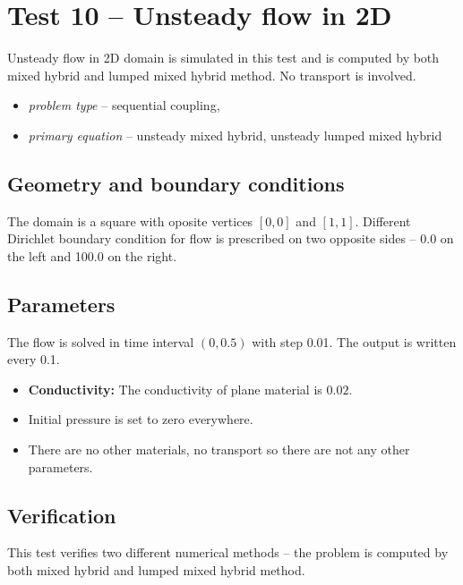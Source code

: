 
\section{Test 10 -- Unsteady flow in 2D}
\label{sec:test10}
Unsteady flow in 2D domain is simulated in this test and is computed by both mixed hybrid and lumped mixed hybrid method. No transport is involved. 

\begin{itemize} 
    \item \emph{problem type} -- sequential coupling, 
    \item \emph{primary equation} -- unsteady mixed hybrid, unsteady lumped mixed hybrid
  \end{itemize}

\subsection*{Geometry and boundary conditions}
The domain is a square with oposite vertices $[0,0]$ and $[1,1]$. Different Dirichlet boundary condition for flow is prescribed on two opposite sides -- 0.0 on the left and 100.0 on the right.

\subsection*{Parameters}
The flow is solved in time interval $(0,0.5)$ with step 0.01. The output is written every 0.1.
\begin{itemize}
  \item \textbf{Conductivity:} The conductivity of plane material is $0.02$.
  \item Initial pressure is set to zero everywhere.
  \item There are no other materials, no transport so there are not any other parameters.
\end{itemize}

\subsection*{Verification}
This test verifies two different numerical methods -- the problem is computed by both mixed hybrid and lumped mixed hybrid method.


